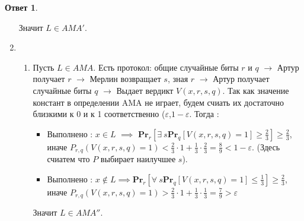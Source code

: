 \documentclass[a4paper]{article}
\theoremstyle{plain}
\theoremstyle{definition}
\newtheorem*{answer}{Ответ}
\begin{document}
\begin{answer}
\begin{enumerate}
\begin{itemize}
    \end{itemize}
    Значит $L \in  AMA'$. 
    \item 
    \begin{enumerate}
    \item Пусть $L \in  AMA$. Есть протокол: общие случайные биты $r$ и $q$ $\to$ Артур получает $r$ $\to$ Мерлин возвращает $s$, зная $r$ $\to$ Артур получает случайные биты $q$ $\to$ Выдает вердикт $V(x,r,s,q)$. Так как значение констант в определении AMA не играет, будем счиать их достаточно близкими к 0 и к 1 соответственно ($\varepsilon$,$1 - \varepsilon$. Тогда : 
    \begin{itemize}
      \item Выполнено : $x \in L$ $\implies$ $\mathbf{Pr}_r[\exists\ s \mathbf{Pr}_q [V(x,r,s,q)=1] \geq \frac{2}{3}] \geq \frac{2}{3}$, иначе $P_{r,q}(V(x,r,s,q) = 1) < \frac{2}{3} \cdot 1 + \frac{1}{3} \cdot \frac{2}{3} = \frac{8}{9} < 1 - \varepsilon$. (Здесь счиатем что $P$ выбирает наилучшее $s$).
      \item  Выполнено : $x \notin L \implies \mathbf{Pr}_r[\forall\ s \mathbf{Pr}_q [V(x,r,s,q)=1] \leq \frac{1}{3}] \geq \frac{2}{3}$, иначе $P_{r,q}(V(x,r,s,q) = 1) > \frac{2}{3} \cdot 1 + \frac{1}{3} \cdot \frac{1}{3} = \frac{7}{9} > \varepsilon$
    \end{itemize}
    Значит $L \in AMA''$.


\end{enumerate}
\end{enumerate}
\end{answer}
\end{document}
